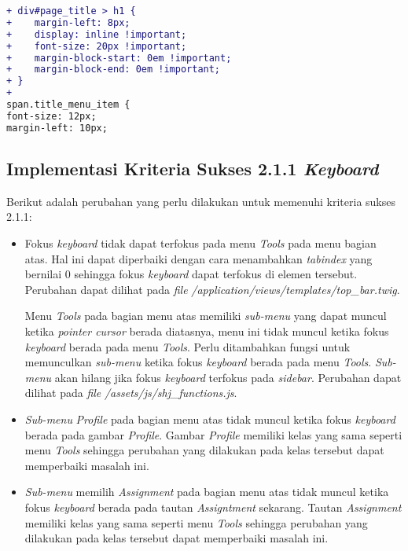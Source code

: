 \begin{itemize}
\begin{lstlisting}[language=diff, caption=Perubahan untuk mematuhi kriteria 1.3.1, label=lst_1.3.1, basicstyle=\ttfamily, frame=single,
columns=fullflexible, keepspaces=true, breaklines=true]
+ div#page_title > h1 {
+    margin-left: 8px;
+    display: inline !important;
+    font-size: 20px !important;
+    margin-block-start: 0em !important;
+    margin-block-end: 0em !important;
+ }
+
span.title_menu_item {
font-size: 12px;
margin-left: 10px;
\end{lstlisting}

\end{itemize}

\subsection{Implementasi Kriteria Sukses 2.1.1 \textit{Keyboard}}
\label{subsec:implementasi_A_2.1.1}
Berikut adalah perubahan yang perlu dilakukan untuk memenuhi kriteria sukses 2.1.1:

\begin{itemize}
	\item Fokus \textit{keyboard} tidak dapat terfokus pada menu \textit{Tools} pada menu bagian atas. Hal ini dapat diperbaiki dengan cara menambahkan \textit{tabindex} yang bernilai 0 sehingga fokus \textit{keyboard} dapat terfokus di elemen tersebut. Perubahan dapat dilihat pada \textit{file} \textit{/application/views/templates/top\_bar.twig}.
	
	Menu \textit{Tools} pada bagian menu atas memiliki \textit{sub-menu} yang dapat muncul ketika \textit{pointer cursor} berada diatasnya, menu ini tidak muncul ketika fokus \textit{keyboard} berada pada menu \textit{Tools}. Perlu ditambahkan fungsi untuk memunculkan \textit{sub-menu} ketika fokus \textit{keyboard} berada pada menu \textit{Tools}. \textit{Sub-menu} akan hilang jika fokus \textit{keyboard} terfokus pada \textit{sidebar}. Perubahan dapat dilihat pada \textit{file} \textit{/assets/js/shj\_functions.js}.

	\item \textit{Sub-menu} \textit{Profile} pada bagian menu atas tidak muncul ketika fokus \textit{keyboard} berada pada gambar \textit{Profile}. Gambar \textit{Profile} memiliki kelas yang sama seperti menu \textit{Tools} sehingga perubahan yang dilakukan pada kelas tersebut dapat memperbaiki masalah ini.
	
	\item \textit{Sub-menu} memilih \textit{Assignment} pada bagian menu atas tidak muncul ketika fokus \textit{keyboard} berada pada tautan \textit{Assigntment} sekarang. Tautan \textit{Assignment} memiliki kelas yang sama seperti menu \textit{Tools} sehingga perubahan yang dilakukan pada kelas tersebut dapat memperbaiki masalah ini.
	

\end{itemize}
